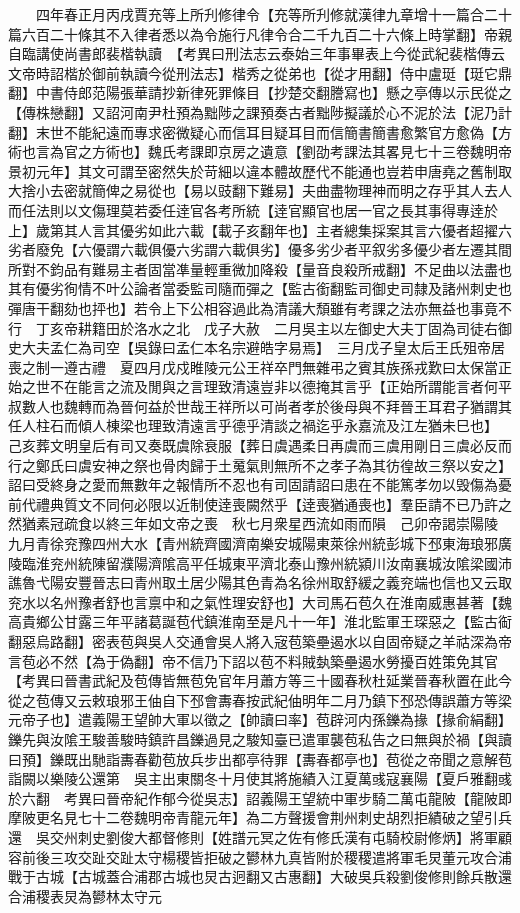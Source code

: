 　　四年春正月丙戌賈充等上所刋修律令【充等所刋修就漢律九章增十一篇合二十篇六百二十條其不入律者悉以為令施行凡律令合二千九百二十六條上時掌翻】帝親自臨講使尚書郎裴楷執讀　【考異曰刑法志云泰始三年事畢表上今從武紀裴楷傳云文帝時詔楷於御前執讀今從刑法志】楷秀之從弟也【從才用翻】侍中盧珽【珽它鼎翻】中書侍郎范陽張華請抄新律死罪條目【抄楚交翻謄寫也】懸之亭傳以示民從之【傳株戀翻】又詔河南尹杜預為黜陟之課預奏古者黜陟擬議於心不泥於法【泥乃計翻】末世不能紀遠而專求密微疑心而信耳目疑耳目而信簡書簡書愈繁官方愈偽【方術也言為官之方術也】魏氏考課即京房之遺意【劉劭考課法其畧見七十三卷魏明帝景初元年】其文可謂至密然失於苛細以違本體故歷代不能通也豈若申唐堯之舊制取大捨小去密就簡俾之易從也【易以豉翻下難易】夫曲盡物理神而明之存乎其人去人而任法則以文傷理莫若委任逹官各考所統【逹官顯官也居一官之長其事得專逹於上】歲第其人言其優劣如此六載【載子亥翻年也】主者總集採案其言六優者超擢六劣者廢免【六優謂六載俱優六劣謂六載俱劣】優多劣少者平叙劣多優少者左遷其間所對不鈞品有難易主者固當凖量輕重微加降殺【量音良殺所戒翻】不足曲以法盡也其有優劣徇情不叶公論者當委監司隨而彈之【監古銜翻監司御史司隸及諸州刺史也彈唐干翻劾也抨也】若令上下公相容過此為清議大頹雖有考課之法亦無益也事竟不行　丁亥帝耕籍田於洛水之北　戊子大赦　二月吳主以左御史大夫丁固為司徒右御史大夫孟仁為司空【吳錄曰孟仁本名宗避皓字易焉】　三月戊子皇太后王氏殂帝居喪之制一遵古禮　夏四月戊戍睢陵元公王祥卒門無雜弔之賓其族孫戎歎曰太保當正始之世不在能言之流及閒與之言理致清遠豈非以德掩其言乎【正始所謂能言者何平叔數人也魏轉而為晉何益於世哉王祥所以可尚者孝於後母與不拜晉王耳君子猶謂其任人柱石而傾人棟梁也理致清遠言乎德乎清談之禍迄乎永嘉流及江左猶未巳也】　己亥葬文明皇后有司又奏既虞除衰服【葬日虞遇柔日再虞而三虞用剛日三虞必反而行之鄭氏曰虞安神之祭也骨肉歸于土䰟氣則無所不之孝子為其彷徨故三祭以安之】詔曰受終身之愛而無數年之報情所不忍也有司固請詔曰患在不能篤孝勿以毁傷為憂前代禮典質文不同何必限以近制使逹喪闕然乎【逹喪猶通喪也】羣臣請不已乃許之然猶素冠疏食以終三年如文帝之喪　秋七月衆星西流如雨而隕　己卯帝謁崇陽陵　九月青徐兖豫四州大水【青州統齊國濟南樂安城陽東萊徐州統彭城下邳東海琅邪廣陵臨淮兖州統陳留濮陽濟隂高平任城東平濟北泰山豫州統潁川汝南襄城汝隂梁國沛譙魯弋陽安豐晉志曰青州取土居少陽其色青為名徐州取舒緩之義兖端也信也又云取兖水以名州豫者舒也言禀中和之氣性理安舒也】大司馬石苞久在淮南威惠甚著【魏高貴鄉公甘露三年平諸葛誕苞代鎮淮南至是凡十一年】淮北監軍王琛惡之【監古䘖翻惡烏路翻】密表苞與吳人交通會吳人將入宼苞築壘遏水以自固帝疑之羊祜深為帝言苞必不然【為于偽翻】帝不信乃下詔以苞不料賊埶築壘遏水勞擾百姓策免其官　【考異曰晉書武紀及苞傳皆無苞免官年月蕭方等三十國春秋杜延業晉春秋置在此今從之苞傳又云敕琅邪王伷自下邳會夀春按武紀伷明年二月乃鎮下邳恐傳誤蕭方等梁元帝子也】遣義陽王望帥大軍以徵之【帥讀曰率】苞辟河内孫鑠為掾【掾俞絹翻】鑠先與汝隂王駿善駿時鎮許昌鑠過見之駿知臺已遣軍襲苞私告之曰無與於禍【與讀曰預】鑠既出馳詣夀春勸苞放兵步出都亭待罪【夀春都亭也】苞從之帝聞之意解苞詣闕以樂陵公還第　吳主出東關冬十月使其將施績入江夏萬彧寇襄陽【夏戶雅翻彧於六翻　考異曰晉帝紀作郁今從吳志】詔義陽王望統中軍步騎二萬屯龍陂【龍陂即摩陂更名見七十二卷魏明帝青龍元年】為二方聲援會荆州刺史胡烈拒績破之望引兵還　吳交州刺史劉俊大都督修則【姓譜元冥之佐有修氏漢有屯騎校尉修炳】將軍顧容前後三攻交趾交趾太守楊稷皆拒破之鬰林九真皆附於稷稷遣將軍毛炅董元攻合浦戰于古城【古城蓋合浦郡古城也炅古迥翻又古惠翻】大破吳兵殺劉俊修則餘兵散還合浦稷表炅為鬰林太守元